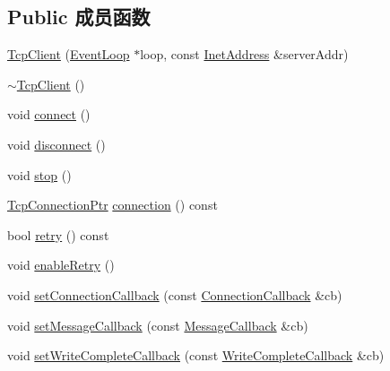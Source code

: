 \subsection*{Public 成员函数}
\begin{DoxyCompactItemize}
\item 
\hyperlink{classmuduo_1_1TcpClient_a8d68694b0595253edef974e8ee289d4c}{Tcp\+Client} (\hyperlink{classmuduo_1_1EventLoop}{Event\+Loop} $\ast$loop, const \hyperlink{classmuduo_1_1InetAddress}{Inet\+Address} \&server\+Addr)
\item 
\hyperlink{classmuduo_1_1TcpClient_a01845d2886f327b9c8cb5df03cb00d7c}{$\sim$\+Tcp\+Client} ()
\item 
void \hyperlink{classmuduo_1_1TcpClient_a1396bf9b5defe9fa844a63b5cd40ac0e}{connect} ()
\item 
void \hyperlink{classmuduo_1_1TcpClient_a960705de531a20389fb29928d43258c3}{disconnect} ()
\item 
void \hyperlink{classmuduo_1_1TcpClient_a8c528baf37154d347366083f0f816846}{stop} ()
\item 
\hyperlink{namespacemuduo_a40c45128e9700d337d92f3cbb8dd4a0a}{Tcp\+Connection\+Ptr} \hyperlink{classmuduo_1_1TcpClient_aad3fe0470c6ae2b643bb3b834742e8f4}{connection} () const
\item 
bool \hyperlink{classmuduo_1_1TcpClient_aed2da3d81e2ab3b35cce19615d9434a7}{retry} () const
\item 
void \hyperlink{classmuduo_1_1TcpClient_a24bbe5c717dfa26078c7deb6cbf9a71c}{enable\+Retry} ()
\item 
void \hyperlink{classmuduo_1_1TcpClient_abbb0008856a8495adb08c8cb7fe65c2c}{set\+Connection\+Callback} (const \hyperlink{namespacemuduo_ac7f7b0c9c9e96123dfea3fe120a2c404}{Connection\+Callback} \&cb)
\item 
void \hyperlink{classmuduo_1_1TcpClient_a0a67f11f92b4cdc6f6c66b861f81cb08}{set\+Message\+Callback} (const \hyperlink{namespacemuduo_ab8a96fa483cffe150618e01058e6fc1b}{Message\+Callback} \&cb)
\item 
void \hyperlink{classmuduo_1_1TcpClient_a94b31be320453fc8aeae81b25934b43f}{set\+Write\+Complete\+Callback} (const \hyperlink{namespacemuduo_a605eda27d048a69607942b95735d7087}{Write\+Complete\+Callback} \&cb)
\end{DoxyCompactItemize}
